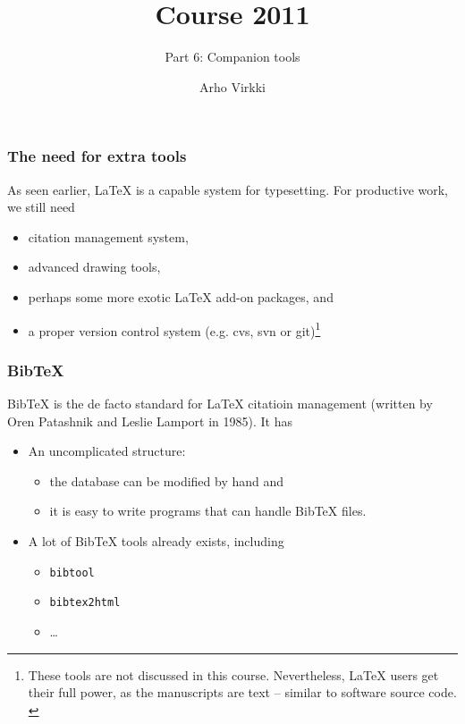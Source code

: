 \documentclass[13pt]{beamer}
\begin{document}
\title{\scalebox{1.5}{\textrm{\LaTeX}} Course 2011}
\subtitle{Part 6: Companion tools}
\author{Arho Virkki}
\date{\scalebox{0.8}{\textcolor{gray}{}}}

\begin{frame}[fragile]
  \titlepage
\end{frame}

\begin{frame}[fragile]\frametitle{The need for extra tools}
As seen earlier, LaTeX is a capable system for typesetting. For productive
work, we still need 
\begin{itemize}
\item citation management system,
\item advanced drawing tools, 
\item perhaps some more exotic LaTeX add-on packages, and
\item a proper version control system (e.g. cvs, svn or 
git)\footnote{These tools are not discussed in this course. Nevertheless, LaTeX
users get their full power, as the manuscripts are text -- similar to software
source code.\\\mbox{}}
\end{itemize}
\end{frame}


\begin{frame}[fragile]\frametitle{BibTeX}

BibTeX is the de facto standard for LaTeX citatioin management
(written by Oren Patashnik and Leslie Lamport in 1985). It has
\begin{itemize}
\item An uncomplicated structure:
\begin{itemize}
  \item the database can be modified by hand and
  \item it is easy to write programs that can handle BibTeX files.
\end{itemize}
\item A lot of BibTeX tools already exists, including
\begin{itemize}
  \item \texttt{bibtool}
  \item \texttt{bibtex2html}
  \item \dots
\end{itemize}
\end{itemize}
\end{frame}
\end{document}
